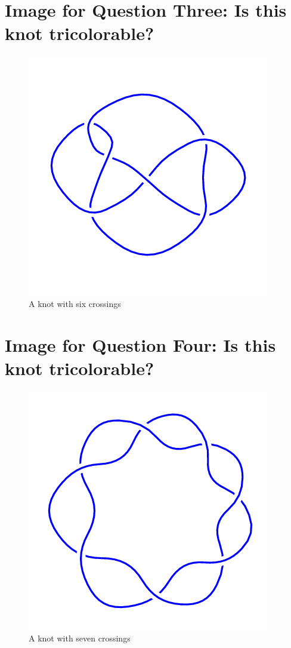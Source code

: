 \documentclass[12pt,letterpaper]{article}
\theoremstyle{definition}
\begin{document}
\clearpage

\section*{Image for Question Three: Is this knot tricolorable?}

\begin{figure}[h]
    \centering
    \includegraphics[width=.45\textwidth]{meeting09pics/6_3.png}
    \caption{A knot with six crossings}
\end{figure}


\section*{Image for Question Four: Is this knot tricolorable?}

\begin{figure}[h]
    \centering
    \includegraphics[width=.45\textwidth]{meeting09pics/7_1.png}
    \caption{A knot with seven crossings}
\end{figure}
\end{document}

